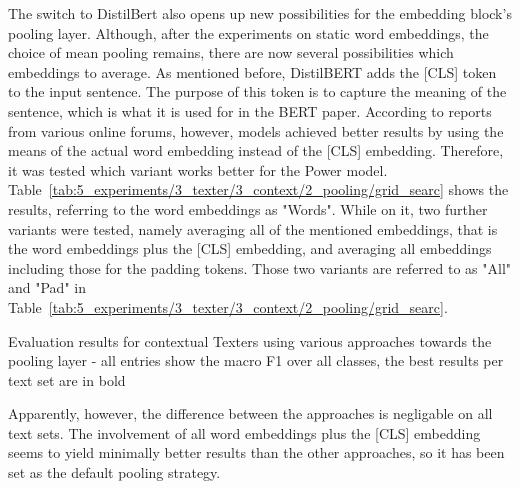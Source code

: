 The switch to DistilBert also opens up new possibilities for the embedding block's pooling layer. Although, after the experiments on static word embeddings, the choice of mean pooling remains, there are now several possibilities which embeddings to average. As mentioned before, DistilBERT adds the [CLS] token to the input sentence. The purpose of this token is to capture the meaning of the sentence, which is what it is used for in the BERT paper. According to reports from various online forums, however, models achieved better results by using the means of the actual word embedding instead of the [CLS] embedding. Therefore, it was tested which variant works better for the Power model. Table~\ref{tab:5_experiments/3_texter/3_context/2_pooling/grid_searc} shows the results, referring to the word embeddings as "Words". While on it, two further variants were tested, namely averaging all of the mentioned embeddings, that is the word embeddings plus the [CLS] embedding, and averaging all embeddings including those for the padding tokens. Those two variants are referred to as "All" and "Pad" in Table~\ref{tab:5_experiments/3_texter/3_context/2_pooling/grid_searc}.

\begin{table}[h]
    \centering
    
    \caption{Evaluation results for contextual Texters using various approaches towards the pooling layer - all entries show the macro F1 over all classes, the best results per text set are in bold}
    \label{tab:5_experiments/3_texter/3_context/2_pooling/grid_search}
\end{table}

Apparently, however, the difference between the approaches is negligable on all text sets. The involvement of all word embeddings plus the [CLS] embedding seems to yield minimally better results than the other approaches, so it has been set as the default pooling strategy.
